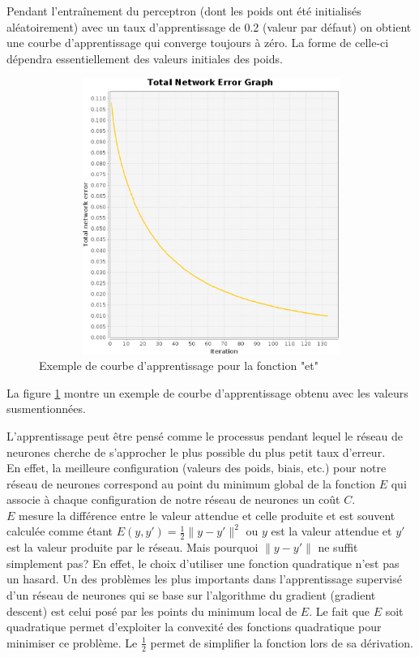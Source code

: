 \documentclass[twoside,openright,a4paper,11pt,french]{article}
\begin{document}
Pendant l'entraînement du perceptron (dont les poids ont été initialisés
aléatoirement) avec un taux d'apprentissage de 0.2 (valeur par
défaut) on obtient une courbe d'apprentissage qui converge toujours à
zéro. La forme de celle-ci dépendra essentiellement des valeurs initiales des
poids. 


\begin{figure}[ht]
\centering
\includegraphics[width=12cm,height=9cm]{./pics/and_error1.eps}
\caption{Exemple de courbe d'apprentissage pour la fonction "et"}
\label{fig:anderr}
\end{figure}

La figure \ref{fig:anderr} montre un exemple de courbe d'apprentissage
obtenu avec les valeurs susmentionnées.

L'apprentissage peut être pensé comme le processus pendant lequel le
réseau de neurones cherche de s'approcher le plus possible du plus petit
taux d'erreur.\\

En effet, la meilleure configuration (valeurs des poids, biais, etc.) pour
notre réseau de neurones correspond au point du minimum global de la fonction
$E$ qui associe à chaque configuration de notre réseau de neurones un coût $C$.\\

$E$ mesure la différence entre le valeur attendue et celle produite et est
souvent calculée comme étant $E(y,y') = \tfrac{1}{2} \lVert y-y'\rVert^2$ ou $y$ est
la valeur attendue et $y'$ est la valeur produite par le réseau.
Mais pourquoi $\lVert y-y'\rVert$ ne suffit simplement pas? 
En effet, le choix d'utiliser une fonction quadratique n'est pas un hasard. 
Un des problèmes les plus importants dans l'apprentissage supervisé d'un réseau
de neurones qui se base sur l'algorithme du gradient (gradient descent) est
celui posé par les points du minimum local de $E$. Le fait que $E$ soit
quadratique permet d'exploiter la convexité des fonctions quadratique pour
minimiser ce problème. Le $\tfrac{1}{2}$ permet de simplifier la fonction lors
de sa dérivation.\\
\end{document}
